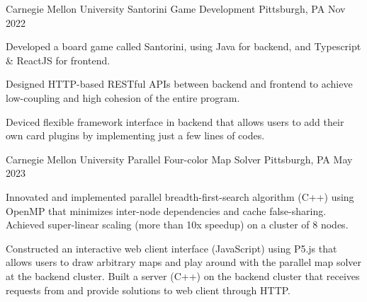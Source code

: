 \begin{cventries}
  \cventry
    {Carnegie Mellon University} %
    {Santorini Game Development} %
    {Pittsburgh, PA} %
    {Nov 2022} %
    {
      \begin{cvitems} %
        \item {Developed a board game called Santorini, using Java for backend, and Typescript \& ReactJS for 
        frontend.}
        \item {Designed HTTP-based RESTful APIs between backend and frontend to achieve low-coupling and 
        high cohesion of the entire program.}
        \item {Deviced flexible framework interface in backend that allows users to add their own card plugins 
        by implementing just a few lines of codes.}
      \end{cvitems}
    }

  \cventry
    {Carnegie Mellon University} %
    {Parallel Four-color Map Solver} %
    {Pittsburgh, PA} %
    {May 2023} %
    {
      \begin{cvitems} %
        \item {Innovated and implemented parallel breadth-first-search algorithm (C++) using OpenMP that minimizes 
        inter-node dependencies and cache false-sharing. Achieved super-linear scaling (more than 10x speedup) on 
        a cluster of 8 nodes.}
        \item {Constructed an interactive web client interface (JavaScript) using P5.js that allows users to draw 
        arbitrary maps and play around with the parallel map solver at the backend cluster. Built a server (C++) 
        on the backend cluster that receives requests from and provide solutions to web client through HTTP.}
      \end{cvitems}
    }

\end{cventries}
